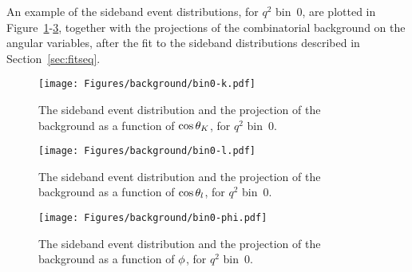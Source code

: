 An example of the sideband event distributions, for $q^2$ bin~0, are plotted in Figure~\ref{fig:bin0-bkg-k}-\ref{fig:bin0-bkg-phi}, together with the projections of the combinatorial background \pdf on the angular variables, after the fit to the sideband distributions described in Section~\ref{sec:fitseq}.

\begin{figure}[!hbt]
  \centering
  \texttt{[image: Figures/background/bin0-k.pdf]}
  \caption{The sideband event distribution and the projection of the background \pdf as a function of $\cos\theta_K$, for $q^2$ bin~0.}
  \label{fig:bin0-bkg-k}
\end{figure}

\begin{figure}[!hbt]
  \centering
  \texttt{[image: Figures/background/bin0-l.pdf]}
  \caption{The sideband event distribution and the projection of the background \pdf as a function of $\cos\theta_l$, for $q^2$ bin~0.}
  \label{fig:bin0-bkg-l}
\end{figure}

\begin{figure}[!hbt]
  \centering
  \texttt{[image: Figures/background/bin0-phi.pdf]}
  \caption{The sideband event distribution and the projection of the background \pdf as a function of $\phi$, for $q^2$ bin~0.}
  \label{fig:bin0-bkg-phi}
\end{figure}

